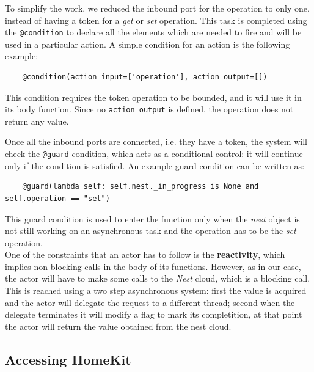 To simplify the work, we reduced the inbound port for the operation to only one, instead of having a token
for a \textit{get} or \textit{set} operation. This task is completed using the \texttt{@condition} to declare
all the elements which are needed to fire and will be used in a particular action.
A simple condition for an action is the following example:
\begin{verbatim}
    @condition(action_input=['operation'], action_output=[])
\end{verbatim}
This condition requires the token operation to be bounded, and it will use it in its body function. Since
no \texttt{action\_output} is defined, the operation does not return any value.

Once all the inbound ports are connected, i.e. they have a token, the system will check the \texttt{@guard} condition,
which acts as a conditional control: it will continue only if the condition is satisfied.
An example guard condition can be written as:

\begin{verbatim}
    @guard(lambda self: self.nest._in_progress is None and self.operation == "set")
\end{verbatim}
This guard condition is used to enter the function only when the \textit{nest} object is not still
working on an asynchronous task and the operation has to be the \textit{set} operation.\\
One of the constraints that an actor has to follow is the \textbf{reactivity}, which implies
non-blocking calls in the body of its functions. However, as in our case, the actor will have to
make some calls to the \textit{Nest} cloud, which is a blocking call. This is reached
using a two step asynchronous system: first the value is acquired and the actor
will delegate the request to a different thread; second when the delegate terminates it will
modify a flag to mark its completition, at that point the actor will return the value obtained
from the nest cloud.











\subsection{Accessing HomeKit}
